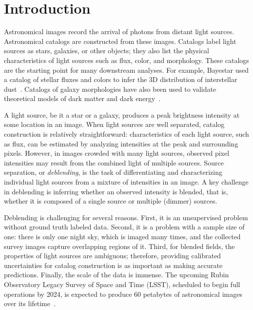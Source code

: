 \section{Introduction}
\label{sec:intro}

Astronomical images record the arrival of photons from distant light sources.
Astronomical catalogs are constructed from these images.
Catalogs label light sources as stars, galaxies, or other objects;
they also list the physical characteristics of light sources such as flux, color, and morphology.
These catalogs are the starting point for many downstream analyses.
For example, Bayestar used a catalog of stellar fluxes and colors to infer
the 3D distribution of interstellar dust~\citep{Green_2019_argonaut}.
Catalogs of galaxy morphologies have also been used to validate theoretical models of dark matter and dark energy~\citep{Abbott2018}.

A light source, be it a star or a galaxy, produces a peak brightness intensity at some location in an image.
When light sources are well separated, catalog construction is relatively straightforward:
characteristics of each light source, such as flux, can be estimated by analyzing
intensities at the peak and surrounding pixels.
However, in images crowded with many light sources,
observed pixel intensities may result from the combined light of multiple sources.
Source separation, or {\itshape deblending}, is the task of differentiating and
characterizing individual light sources from a mixture of intensities in an image.
A key challenge in deblending is inferring whether an observed intensity is blended,
that is, whether it is composed of a single source or multiple (dimmer) sources.


Deblending is challenging for several reasons.
First, it is an unsupervised problem without ground truth labeled data.
Second, it is a problem with a sample size of one: there is only one night sky, which is imaged many times, and the collected survey images capture overlapping regions of it.
Third, for blended fields, the properties of light sources are ambiguous; therefore, providing calibrated uncertainties for catalog construction is as important as making accurate predictions.
Finally, the scale of the data is immense.
The upcoming Rubin Observatory Legacy Survey of Space and Time (LSST),
scheduled to begin full operations by 2024,
is expected to produce 60 petabytes of astronomical images over its lifetime~\citep{LSSTabout}.

